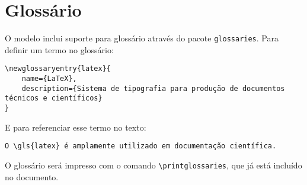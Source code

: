\section{Glossário}

O modelo inclui suporte para glossário através do pacote \texttt{glossaries}. Para definir um termo no glossário:

\begin{quotebox}
\verb|\newglossaryentry{latex}{|\\
\verb|    name={LaTeX},|\\
\verb|    description={Sistema de tipografia para produção de documentos técnicos e científicos}|\\
\verb|}|
\end{quotebox}

E para referenciar esse termo no texto:

\begin{quotebox}
\verb|O \gls{latex} é amplamente utilizado em documentação científica.|
\end{quotebox}

O glossário será impresso com o comando \verb|\printglossaries|, que já está incluído no documento.

